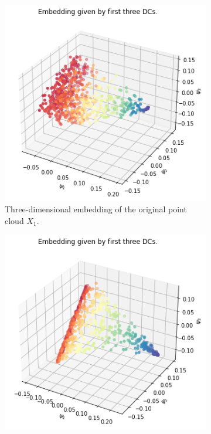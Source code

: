 \begin{figure}[H]
\centering
\begin{subfigure}[b]{0.3\textwidth}
    \includegraphics[width=\textwidth]{figures/topology/X1_embedding.png}
    \caption{Three-dimensional embedding of the original point cloud $X_1$.}
\end{subfigure}
\hfill
\begin{subfigure}[b]{0.3\textwidth}
    \includegraphics[width=\textwidth]{figures/topology/X2_embedding.png}

\end{subfigure}
\end{figure}
